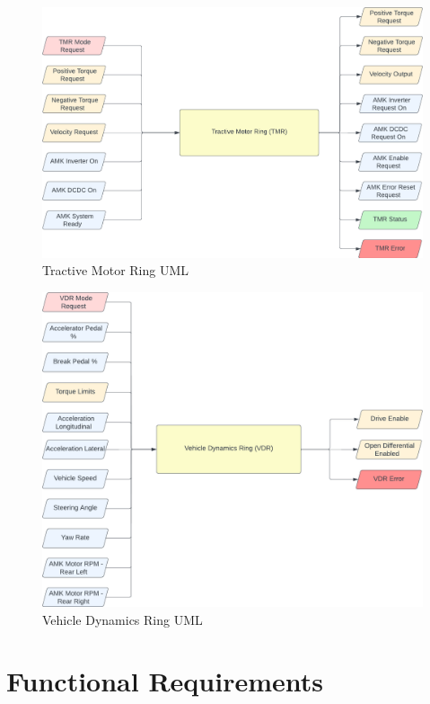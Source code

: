 \documentclass[12pt]{article}
\begin{document}
\begin{figure}[htp]
    \centering
    \includegraphics[width=15cm]{tmr_uml.png}
    \caption{Tractive Motor Ring UML}
    \label{fig:tmr_uml}
\end{figure}

\begin{figure}[htp]
    \centering
    \includegraphics[width=15cm]{vdr_uml.png}
    \caption{Vehicle Dynamics Ring UML}
    \label{fig:vdr_uml}
\end{figure}

\newpage
\section{Functional Requirements}
\end{document}
